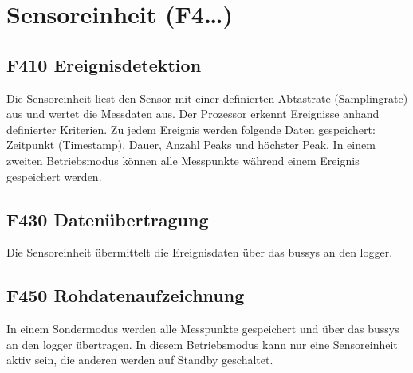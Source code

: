 \section{Sensoreinheit (F4\ldots)}


\subsection{F410 Ereignisdetektion}
Die Sensoreinheit liest den Sensor mit einer definierten Abtastrate (Samplingrate) aus und wertet die Messdaten aus. Der Prozessor erkennt Ereignisse anhand definierter Kriterien. Zu jedem Ereignis werden folgende Daten gespeichert: Zeitpunkt (Timestamp), Dauer, Anzahl Peaks und höchster Peak. In einem zweiten Betriebsmodus können alle Messpunkte während einem Ereignis gespeichert werden.


\subsection{F430 Datenübertragung}
Die Sensoreinheit übermittelt die Ereignisdaten über das \gls{bussys} an den \gls{logger}.


\subsection{F450 Rohdatenaufzeichnung}
In einem Sondermodus werden alle Messpunkte gespeichert und über das \gls{bussys} an den \gls{logger} übertragen. In diesem Betriebsmodus kann nur eine Sensoreinheit aktiv sein, die anderen werden auf Standby geschaltet.



